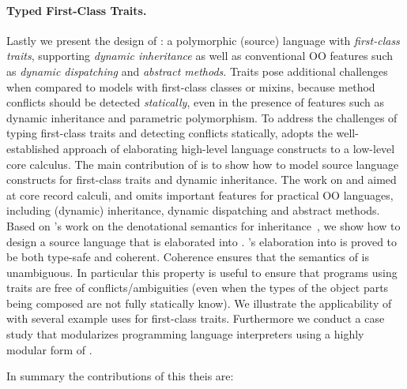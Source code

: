 \paragraph{Typed First-Class Traits.}

Lastly we present the design of \sedel: a polymorphic (source) language with
\emph{first-class traits}, supporting \emph{dynamic inheritance} as well as
conventional OO features such as \emph{dynamic dispatching} and \emph{abstract
  methods}. Traits pose additional challenges when compared to models with
first-class classes or mixins, because method conflicts should be detected
\emph{statically}, even in the presence of features such as dynamic inheritance and
parametric polymorphism. To address the challenges of
typing first-class traits and detecting conflicts statically, \sedel adopts the
well-established approach of elaborating high-level language constructs to a
low-level core calculus. The main contribution of \sedel is to show how to model
source language constructs for first-class traits and dynamic inheritance. The
work on \namee and \fnamee aimed at core record calculi, and omits important
features for practical OO languages, including (dynamic) inheritance, dynamic
dispatching and abstract methods. Based on \citeauthor{cook1989denotational}'s
work on the denotational semantics for inheritance~\citep{cook1989denotational},
we show how to design a source language that is elaborated into \fnamee.
\sedel's elaboration into \fnamee is proved to be both type-safe and coherent.
Coherence ensures that the semantics of \sedel is unambiguous. In particular
this property is useful to ensure that programs using traits are free of
conflicts/ambiguities (even when the types of the object parts being composed
are not fully statically know). We illustrate the applicability of \sedel with
several example uses for first-class traits. Furthermore we conduct a case study
that modularizes programming language interpreters using a highly modular form
of \visitor.

In summary the contributions of this theis are:

